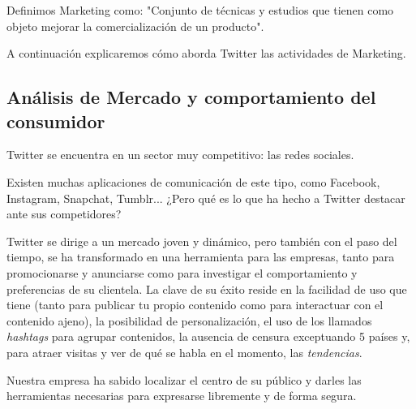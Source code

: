 Definimos Marketing como: "Conjunto de técnicas y estudios que tienen como objeto mejorar la comercialización de un producto".

A continuación explicaremos cómo aborda Twitter las actividades de Marketing.

\subsection{Análisis de Mercado y comportamiento del consumidor}

Twitter se encuentra en un sector muy competitivo: las redes sociales.

Existen muchas aplicaciones de comunicación de este tipo, como Facebook, Instagram, Snapchat, Tumblr... ¿Pero qué es lo que ha hecho a Twitter destacar ante sus competidores?

Twitter se dirige a un mercado joven y dinámico, pero también con el paso del tiempo, se ha transformado en una herramienta para las empresas, tanto para promocionarse y anunciarse como para investigar el comportamiento y preferencias de su clientela.
La clave de su éxito reside en la facilidad de uso que tiene (tanto para publicar tu propio contenido como para interactuar con el contenido ajeno), la posibilidad de personalización, el uso de los llamados \textit{hashtags} para agrupar contenidos, la ausencia de censura exceptuando 5 países y, para atraer visitas y ver de qué se habla en el momento, las \textit{tendencias}.

Nuestra empresa ha sabido localizar el centro de su público y darles las herramientas necesarias para expresarse libremente y de forma segura.

